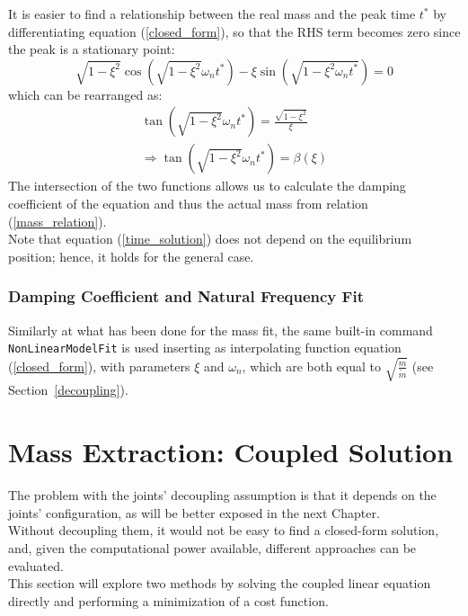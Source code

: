 \documentclass[a4paper,12pt,oneside]{report}
\begin{document}
It is easier to find a relationship between the real mass and the peak time $t^*$ by differentiating equation (\ref{closed_form}), so that the RHS term becomes zero since the peak is a stationary point:
\begin{equation}
  \sqrt{1-\xi^2}\cos{(\sqrt{1-\xi^2}\omega_nt^*)-\xi\sin{(\sqrt{1-\xi^2\omega_nt^*})}}=0
  \label{time_solution}
\end{equation}
which can be rearranged as:
\begin{equation}
  \begin{array}{l}
  \tan{(\sqrt{1-\xi^2}\omega_nt^*)}=\frac{\sqrt{1-\xi^2}}{\xi}\\
  \Rightarrow \tan{(\sqrt{1-\xi^2}\omega_nt^*)}=\beta(\xi)
\end{array}
\end{equation}
The intersection of the two functions allows us to calculate the damping coefficient of the equation and thus the actual mass from relation (\ref{mass_relation}).\\
Note that equation (\ref{time_solution}) does not depend on the equilibrium position; hence, it holds for the general case.
\subsubsection{Damping Coefficient and Natural Frequency Fit}
Similarly at what has been done for the mass fit, the same built-in command \texttt{NonLinearModelFit} is used inserting as interpolating function equation (\ref{closed_form}), with parameters $\xi$ and $\omega_n$, which are both equal to $\sqrt{\frac{\hat{m}}{\tilde{m}}}$ (see Section~\ref{decoupling}).
\newpage
\section{Mass Extraction: Coupled Solution}
The problem with the joints' decoupling assumption is that it depends on the joints' configuration, as will be better exposed in the next Chapter.\\
Without decoupling them, it would not be easy to find a closed-form solution, and, given the computational power available, different approaches can be evaluated.\\
This section will explore two methods by solving the coupled linear equation directly and performing a minimization of a cost function.
\end{document}
